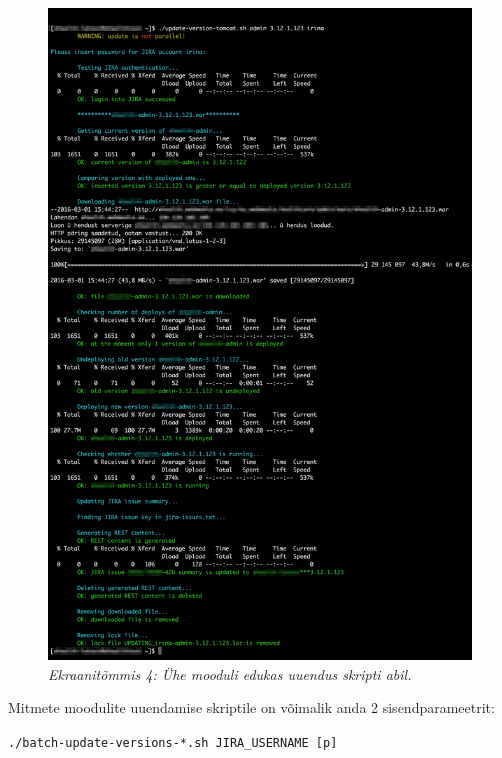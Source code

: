\documentclass[12pt]{report}
\newcommand{\code}[1]{\texttt{#1}}
\begin{document}
  \begin{figure}[H]
     \begin{center} 
       \includegraphics[width=\textwidth]{screenshots/one-module-successful-update.png}
       \caption*{\textit{Ekraanitõmmis 4: Ühe mooduli edukas uuendus skripti abil.}}
     \end{center}
   \end{figure}
  
  Mitmete moodulite uuendamise skriptile on võimalik anda 2 sisendparameetrit:
  
  \begin{center}
    \small{\code{./batch-update-versions-*.sh JIRA\_USERNAME [p]}}
  \end{center}
  
\end{document}

